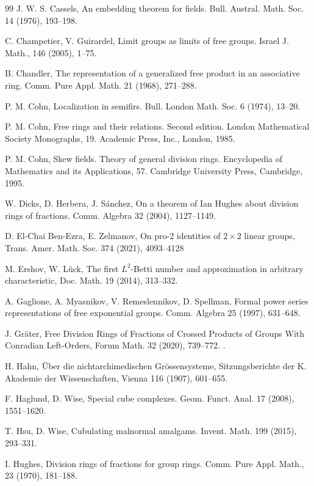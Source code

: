 \documentclass[11pt]{amsart}
\numberwithin{claimcounter}{lem}
\begin{document}
\begin{thebibliography}{99}
  J. W. S. Cassels, 
An embedding theorem for fields.
Bull. Austral. Math. Soc. 14 (1976), 193--198.
  
 C.  Champetier, V. Guirardel, Limit groups as limits
of free groups. Israel J. Math., 146 (2005), 1--75.

 B. Chandler,  The representation of a generalized free product in an associative ring.
Comm. Pure Appl. Math. 21 (1968), 271--288. 


    P. M. Cohn, Localization in semifirs. Bull. London Math. Soc. 6 (1974), 13--20.

  P. M.  Cohn, Free rings and their relations. Second edition. London Mathematical Society Monographs, 19. Academic Press, Inc., London, 1985. 


 P. M. Cohn, Skew fields. Theory of general division rings.
Encyclopedia of Mathematics and its Applications, 57. Cambridge
University Press, Cambridge, 1995.

  W. Dicks, D. Herbera, J. S\'anchez,  On a theorem of Ian Hughes about division rings of fractions. Comm. Algebra 32 (2004),  1127--1149.

 D. El-Chai Ben-Ezra, E. Zelmanov, On pro-2 identities of $2\times2$ linear groups, Trans. Amer. Math. Soc. 374 (2021), 4093--4128 

 M. Ershov, W. L\"uck,  
The first $L^2$-Betti number and approximation in arbitrary characteristic, Doc. Math. 19 (2014), 313--332. 
  
    A. Gaglione,  A.  Myasnikov, V.  Remeslennikov, D. Spellman,   Formal power series representations of free exponential groups. Comm. Algebra 25 (1997),    631--648. 
  
   J. Gr\"ater,   Free Division Rings of Fractions of Crossed Products of Groups With Conradian Left-Orders,   Forum Math. 32 (2020),  739--772. .
  
   H. Hahn, \"Uber die nichtarchimedischen Gr\"ossensysteme, Sitzungsberichte der K. Akademie der Wissenschaften, Vienna  116 (1907),  601--655.

     F. Haglund, D. Wise, Special cube complexes. Geom. Funct. Anal. 17 (2008),   1551--1620.
   
     T. Hsu, D. Wise,  Cubulating malnormal amalgams. Invent. Math. 199 (2015),  293--331. 
  
    I. Hughes, Division rings of fractions for group rings. Comm. Pure Appl. Math., 23 (1970), 181--188.
  

\end{thebibliography}
\end{document}
